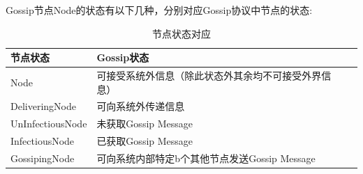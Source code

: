 Gossip节点Node的状态有以下几种，分别对应Gossip协议中节点的状态:
\begin{table}[!hpt]
    \caption[节点状态对应]{节点状态对应\footnotemark}
    \label{tab:firstone}
    \centering
    \begin{tabular}{@{}llr@{}} \toprule
      节点状态 & Gossip状态 \\ \midrule
      Node&可接受系统外信息（除此状态外其余均不可接受外界信息）\\
      DeliveringNode&可向系统外传递信息\\
      UnInfectiousNode&未获取Gossip Message\\
      InfectiousNode&已获取Gossip Message\\
      GossipingNode&可向系统内部特定b个其他节点发送Gossip Message\\ \bottomrule
    \end{tabular}
  \end{table}


